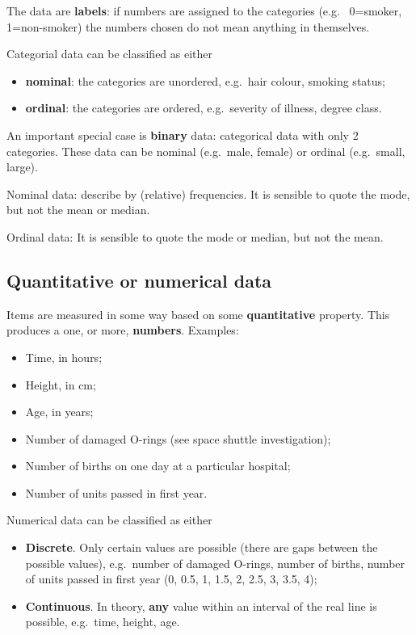 \documentclass[
  british,
  11pt,
  openany, a4paper]{book}
\providecommand{\tightlist}{%
  \setlength{\itemsep}{0pt}\setlength{\parskip}{0pt}}
\begin{document}
The data are \textbf{labels}: if numbers are assigned to the categories (e.g.~
0=smoker, 1=non-smoker) the numbers chosen do not mean anything in themselves.

Categorial data can be classified as either

\begin{itemize}
\tightlist
\item
  \textbf{nominal}: the categories are unordered, e.g.~hair colour, smoking status;
\item
  \textbf{ordinal}: the categories are ordered, e.g.~severity of illness, degree class.
\end{itemize}

An important special case is \textbf{binary} data: categorical data with only 2 categories. These data can be nominal (e.g.~male, female) or ordinal (e.g.~small, large).

Nominal data: describe by (relative) frequencies. It is sensible to quote the mode, but not the mean or median.

Ordinal data: It is sensible to quote the mode or median, but not the mean.

\subsection{Quantitative or numerical data}\label{quantitative-or-numerical-data}

Items are measured in some way based on some \textbf{quantitative} property. This produces a one, or more, \textbf{numbers}. Examples:

\begin{itemize}
\tightlist
\item
  Time, in hours;
\item
  Height, in cm;
\item
  Age, in years;
\item
  Number of damaged O-rings (see space shuttle investigation);
\item
  Number of births on one day at a particular hospital;
\item
  Number of units passed in first year.
\end{itemize}

Numerical data can be classified as either

\begin{itemize}
\tightlist
\item
  \textbf{Discrete}. Only certain values are possible (there are gaps between the possible values), e.g.~number of damaged O-rings, number of births, number of units passed in first year (0, 0.5, 1, 1.5, 2, 2.5, 3, 3.5, 4);
\item
  \textbf{Continuous}. In theory, \textbf{any} value within an interval of the real line
  is possible, e.g.~time, height, age.
\end{itemize}
\end{document}
